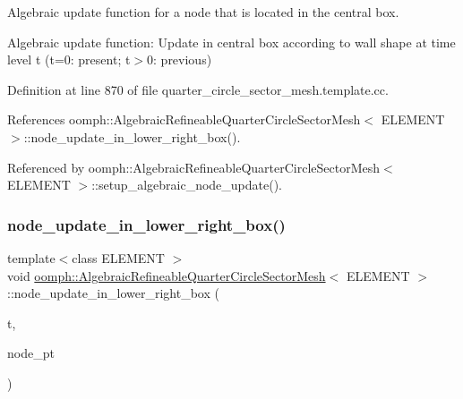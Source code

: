 Algebraic update function for a node that is located in the central box. 

Algebraic update function\+: Update in central box according to wall shape at time level t (t=0\+: present; t$>$0\+: previous) 

Definition at line 870 of file quarter\+\_\+circle\+\_\+sector\+\_\+mesh.\+template.\+cc.



References oomph\+::\+Algebraic\+Refineable\+Quarter\+Circle\+Sector\+Mesh$<$ E\+L\+E\+M\+E\+N\+T $>$\+::node\+\_\+update\+\_\+in\+\_\+lower\+\_\+right\+\_\+box().



Referenced by oomph\+::\+Algebraic\+Refineable\+Quarter\+Circle\+Sector\+Mesh$<$ E\+L\+E\+M\+E\+N\+T $>$\+::setup\+\_\+algebraic\+\_\+node\+\_\+update().

\mbox{\label{classoomph_1_1AlgebraicRefineableQuarterCircleSectorMesh_a9a7d3e4a2126346cdae3bde51eff7b36}} 
\subsubsection{\texorpdfstring{node\+\_\+update\+\_\+in\+\_\+lower\+\_\+right\+\_\+box()}{node\_update\_in\_lower\_right\_box()}}
{\footnotesize\ttfamily template$<$class E\+L\+E\+M\+E\+NT $>$ \\
void \hyperlink{classoomph_1_1AlgebraicRefineableQuarterCircleSectorMesh}{oomph\+::\+Algebraic\+Refineable\+Quarter\+Circle\+Sector\+Mesh}$<$ E\+L\+E\+M\+E\+NT $>$\+::node\+\_\+update\+\_\+in\+\_\+lower\+\_\+right\+\_\+box (\begin{DoxyParamCaption}\item[{const unsigned \&}]{t,  }\item[{Algebraic\+Node $\ast$\&}]{node\+\_\+pt }\end{DoxyParamCaption})\hspace{0.3cm}{\ttfamily [private]}}



